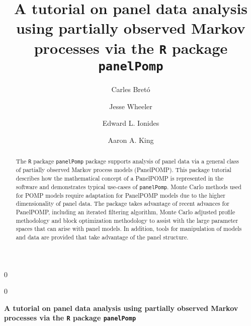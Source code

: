 \documentclass[12pt]{article}\usepackage[]{graphicx}\usepackage[table]{xcolor}
\newcommand{\blind}{0}
\newcommand\R{\texttt{R}\xspace}
\newcommand\panelPomp{\texttt{panelPomp}\xspace}
\begin{document}
%

\def\spacingset#1{\renewcommand{\baselinestretch}%
{#1}\small\normalsize} \spacingset{1}




\blind
{
  \title{\bf A tutorial on panel data analysis using partially observed Markov processes via the \R package \panelPomp}

  \author[1]{Carles Bret\'o}
  \author[2]{Jesse Wheeler}
  \author[2]{Edward L. Ionides}
  \author[2]{Aaron A. King}


  \maketitle
} \fi

\blind
{
  \bigskip
  \bigskip
  \bigskip
  \begin{center}
    {\Large\bf A tutorial on panel data analysis using partially observed Markov processes via the \R package \panelPomp}
\end{center}
  \medskip
} \fi

\bigskip
\begin{abstract}
\noindent The \R package \panelPomp package supports analysis of panel data via a general class of partially observed Markov process models (PanelPOMP).
This package tutorial describes how the mathematical concept of a PanelPOMP is represented in the software and demonstrates typical use-cases of \panelPomp.
Monte Carlo methods used for POMP models require adaptation for PanelPOMP models due to the higher dimensionality of panel data.
The package takes advantage of recent advances for PanelPOMP, including an iterated filtering algorithm, Monte Carlo adjusted profile methodology and block optimization methodology to assist with the large parameter spaces that can arise with panel models.
In addition, tools for manipulation of models and data are provided that take advantage of the panel structure.
\end{abstract}
\end{document}

